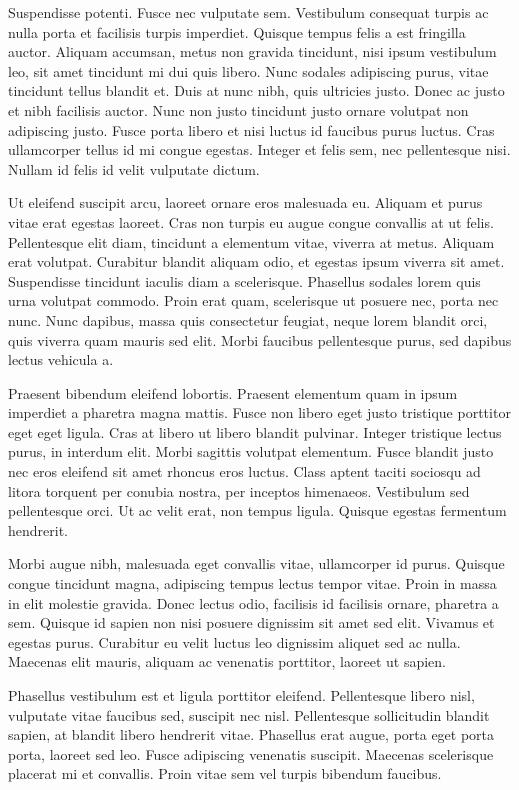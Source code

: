 Suspendisse potenti. Fusce nec vulputate sem. Vestibulum consequat turpis ac nulla porta et facilisis turpis imperdiet. Quisque tempus felis a est fringilla auctor. Aliquam accumsan, metus non gravida tincidunt, nisi ipsum vestibulum leo, sit amet tincidunt mi dui quis libero. Nunc sodales adipiscing purus, vitae tincidunt tellus blandit et. Duis at nunc nibh, quis ultricies justo. Donec ac justo et nibh facilisis auctor. Nunc non justo tincidunt justo ornare volutpat non adipiscing justo. Fusce porta libero et nisi luctus id faucibus purus luctus. Cras ullamcorper tellus id mi congue egestas. Integer et felis sem, nec pellentesque nisi. Nullam id felis id velit vulputate dictum.

Ut eleifend suscipit arcu, laoreet ornare eros malesuada eu. Aliquam et purus vitae erat egestas laoreet. Cras non turpis eu augue congue convallis at ut felis. Pellentesque elit diam, tincidunt a elementum vitae, viverra at metus. Aliquam erat volutpat. Curabitur blandit aliquam odio, et egestas ipsum viverra sit amet. Suspendisse tincidunt iaculis diam a scelerisque. Phasellus sodales lorem quis urna volutpat commodo. Proin erat quam, scelerisque ut posuere nec, porta nec nunc. Nunc dapibus, massa quis consectetur feugiat, neque lorem blandit orci, quis viverra quam mauris sed elit. Morbi faucibus pellentesque purus, sed dapibus lectus vehicula a.

Praesent bibendum eleifend lobortis. Praesent elementum quam in ipsum imperdiet a pharetra magna mattis. Fusce non libero eget justo tristique porttitor eget eget ligula. Cras at libero ut libero blandit pulvinar. Integer tristique lectus purus, in interdum elit. Morbi sagittis volutpat elementum. Fusce blandit justo nec eros eleifend sit amet rhoncus eros luctus. Class aptent taciti sociosqu ad litora torquent per conubia nostra, per inceptos himenaeos. Vestibulum sed pellentesque orci. Ut ac velit erat, non tempus ligula. Quisque egestas fermentum hendrerit.

Morbi augue nibh, malesuada eget convallis vitae, ullamcorper id purus. Quisque congue tincidunt magna, adipiscing tempus lectus tempor vitae. Proin in massa in elit molestie gravida. Donec lectus odio, facilisis id facilisis ornare, pharetra a sem. Quisque id sapien non nisi posuere dignissim sit amet sed elit. Vivamus et egestas purus. Curabitur eu velit luctus leo dignissim aliquet sed ac nulla. Maecenas elit mauris, aliquam ac venenatis porttitor, laoreet ut sapien.

Phasellus vestibulum est et ligula porttitor eleifend. Pellentesque libero nisl, vulputate vitae faucibus sed, suscipit nec nisl. Pellentesque sollicitudin blandit sapien, at blandit libero hendrerit vitae. Phasellus erat augue, porta eget porta porta, laoreet sed leo. Fusce adipiscing venenatis suscipit. Maecenas scelerisque placerat mi et convallis. Proin vitae sem vel turpis bibendum faucibus.

\proofread
